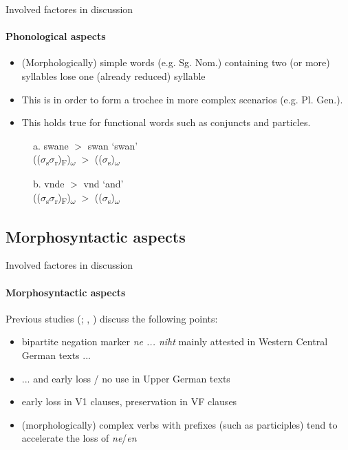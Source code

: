 \documentclass[xcolor=table, compress, %
handout
]{beamer}
\begin{document}
\begin{frame}{Involved factores in discussion}
\framesubtitle{Phonological aspects}

\begin{itemize}
    \item (Morphologically) simple words (e.g. Sg. Nom.) containing two (or more) syllables lose one (already reduced) syllable
    \item This is in order to form a trochee in more complex scenarios (e.g. Pl. Gen.).
    \item This holds true for functional words such as conjuncts and particles.
\end{itemize}
\vspace{-0.5cm}
\begin{figure} 
\begin{minipage}[t]{0.4755\textwidth}
\pex a. swane    $>$ swan ‘swan’\\
(($\sigma$\textsubscript{s}$\sigma$\textsubscript{r})\textsubscript{F})\textsubscript{$\omega$}  $>$ 
        (($\sigma$\textsubscript{s}\alert{\emptyset})\textsubscript{$\omega$}
\end{minipage}
\begin{minipage}[t]{0.475\textwidth}
\exdisplay b. vnde         $>$ vnd ‘and’\\
(($\sigma$\textsubscript{s}$\sigma$\textsubscript{r})\textsubscript{F})\textsubscript{$\omega$}  $>$ 
         (($\sigma$\textsubscript{s}\alert{\emptyset})\textsubscript{$\omega$}
\end{minipage} 
\end{figure}

\end{frame}

\subsection{Morphosyntactic aspects}
\begin{frame}{Involved factores in discussion}
\framesubtitle{Morphosyntactic aspects}
Previous studies (\citealt{behaghel18,Gaertner1977,Pickl2017}; \citealt{schueler16,schueler17}, \citealt{hrbek21}) discuss the following points:

\begin{itemize}
    \item bipartite negation marker \textit{ne ... niht} mainly attested in Western Central German texts ...
    \item ... and early loss / no use in Upper German texts
    \item early loss in V1 clauses, preservation in VF clauses
    \item (morphologically) complex verbs with prefixes (such as participles) tend to accelerate the loss of \textit{ne}/\textit{en}
\end{itemize}

\end{frame}
\end{document}
